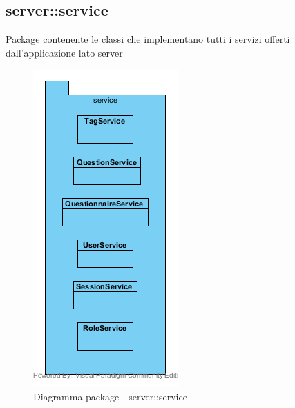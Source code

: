 \subsection{server::service}
Package contenente le classi che implementano tutti i servizi offerti dall'applicazione lato server\begin{center}
	\begin{figure}[H]
		\centering \includegraphics[scale=4, max width=\textwidth, max height=\myheight]{../img/diagrammiClassi/server/service.png}
		\caption{Diagramma package - server::service}
	\end{figure}
\end{center}\hypertarget{server::service::UserService}{}
